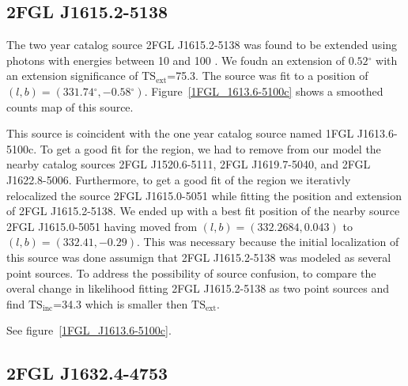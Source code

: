 \documentclass[12pt,preprint]{aastex}
\newcommand{\gev}{\text{GeV}\xspace}
\newcommand{\tsext}{{\ensuremath{\text{TS}_\text{ext}}}\xspace}
\newcommand{\tsinc}{\ensuremath{\text{TS}_\text{inc}}\xspace}
\renewcommand{\deg}{\ensuremath{^\circ}\xspace}
\begin{document}
\subsection{2FGL J1615.2-5138}


The two year catalog source 2FGL J1615.2-5138 was found to be extended
using photons with energies between 10 \gev and 100 \gev. We foudn an
extension of $0.52\deg$ with an extension significance of \tsext=75.3.
The source was fit to a position of $(l,b)=(331.74\deg,-0.58\deg)$.
Figure~\ref{1FGL_1613.6-5100c} shows a smoothed counts map of this source.

This source is coincident with the one year catalog source named 1FGL
J1613.6-5100c. To get a good fit for the region, we had to remove from our
model the nearby catalog sources 2FGL J1520.6-5111, 2FGL J1619.7-5040,
and 2FGL J1622.8-5006. Furthermore, to get a good fit of the region we
iterativly relocalized the source 2FGL J1615.0-5051 while fitting the
position and extension of 2FGL J1615.2-5138.  We ended up with a best
fit position of the nearby source 2FGL J1615.0-5051 having moved from
$(l,b)=(332.2684,0.043)$ to $(l,b)=(332.41,-0.29)$. This was necessary
because the initial localization of this source was done assumign that
2FGL J1615.2-5138 was modeled as several point sources.  To address
the possibility of source confusion, to compare the overal change in
likelihood fitting 2FGL J1615.2-5138 as two point sources and find
\tsinc=34.3 which is smaller then \tsext.


See figure~\ref{1FGL_J1613.6-5100c}.


\subsection{2FGL J1632.4-4753}

\end{document}
